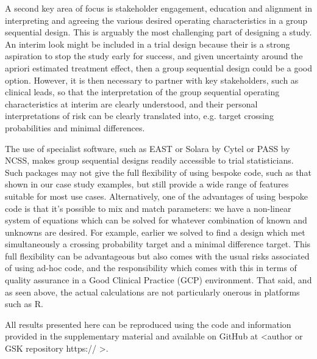 \documentclass{article}
\begin{document}
A second key area of focus is stakeholder engagement, education and alignment in interpreting and agreeing the various desired operating characteristics in a group sequential design. This is arguably the most challenging part of designing a study. An interim look might be included in a trial design because their is a strong aspiration to stop the study early for success, and given uncertainty around the apriori estimated treatment effect, then a group sequential design could be a good option. However, it is then necessary to partner with key stakeholders, such as clinical leads, so that the interpretation of the group sequential operating characteristics at interim are clearly understood, and their personal interpretations of risk can be clearly translated into, e.g. target crossing probabilities and minimal differences. 

The use of specialist software, such as EAST or Solara by Cytel or PASS by NCSS, makes group sequential designs readily accessible to trial statisticians. Such packages may not give the full flexibility of using bespoke code, such as that shown in our case study examples, but still provide a wide range of features suitable for most use cases. Alternatively, one of the advantages of using bespoke code is that it's possible to mix and match parameters: we have a non-linear system of equations which can be solved for whatever combination of known and unknowns are desired. For example, earlier we solved to find a design which met simultaneously a crossing probability target and a minimal difference target. This full flexibility can be advantageous but also comes with the usual risks associated of using ad-hoc code, and the responsibility which comes with this in terms of quality assurance in a Good Clinical Practice (GCP) environment. That said, and as seen above, the actual calculations are not particularly onerous in platforms such as R. 

All results presented here can be reproduced using the code and information provided in the supplementary material and available on GitHub at <author or GSK repository https:// >.







\end{document}
